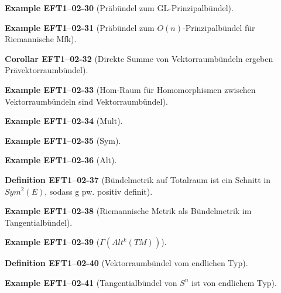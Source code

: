 \documentclass[10pt, letterpaper]{article}
\newcommand{\CustomHeading}[3]{%
  \par\medskip\noindent%
  \textbf{#1 #2} \textnormal{(#3)}.\enskip%
}
\newenvironment{DEF}[2]{\CustomHeading{Definition}{#1}{#2}}{}
\newenvironment{KORO}[2]{\CustomHeading{Corollar}{#1}{#2}}{}
\newenvironment{EXA}[2]{\CustomHeading{Example}{#1}{#2}}{}
\begin{document}
\begin{EXA}{EFT1--02-30}{Präbündel zum GL-Prinzipalbündel}
\end{EXA}

\begin{EXA}{EFT1--02-31}{Präbündel zum $O(n)$-Prinzipalbündel für Riemannische Mfk}
\end{EXA}

\begin{KORO}{EFT1--02-32}{Direkte Summe von Vektorraumbündeln ergeben Prävektorraumbündel}
\end{KORO}

\begin{EXA}{EFT1--02-33}{Hom-Raum für Homomorphismen zwischen Vektorraumbündeln sind Vektorraumbündel}
\end{EXA}

\begin{EXA}{EFT1--02-34}{Mult}
\end{EXA}

\begin{EXA}{EFT1--02-35}{Sym}
\end{EXA}

\begin{EXA}{EFT1--02-36}{Alt}
\end{EXA}

\begin{DEF}{EFT1--02-37}{Bündelmetrik auf Totalraum ist ein Schnitt in $Sym^2(E)$, sodass g pw. positiv definit}
\end{DEF}

\begin{EXA}{EFT1--02-38}{Riemannische Metrik als Bündelmetrik im Tangentialbündel}
\end{EXA}

\begin{EXA}{EFT1--02-39}{$\Gamma (Alt^k(TM))$}
\end{EXA}

\begin{DEF}{EFT1--02-40}{Vektorraumbündel vom endlichen Typ}
\end{DEF}

\begin{EXA}{EFT1--02-41}{Tangentialbündel von $S^n$ ist von endlichem Typ}
\end{EXA}
\end{document}

